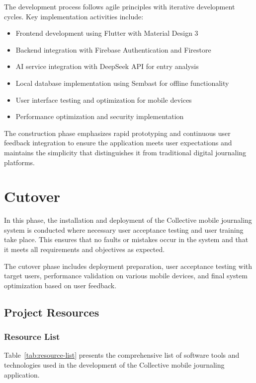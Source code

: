 The development process follows agile principles with iterative development cycles. Key implementation activities include:

\begin{itemize}
\item Frontend development using Flutter with Material Design 3
\item Backend integration with Firebase Authentication and Firestore
\item AI service integration with DeepSeek API for entry analysis
\item Local database implementation using Sembast for offline functionality
\item User interface testing and optimization for mobile devices
\item Performance optimization and security implementation
\end{itemize}

The construction phase emphasizes rapid prototyping and continuous user feedback integration to ensure the application meets user expectations and maintains the simplicity that distinguishes it from traditional digital journaling platforms.

\section{Cutover}\label{sec:cutover}

In this phase, the installation and deployment of the Collective mobile journaling system is conducted where necessary user acceptance testing and user training take place. This ensures that no faults or mistakes occur in the system and that it meets all requirements and objectives as expected.

The cutover phase includes deployment preparation, user acceptance testing with target users, performance validation on various mobile devices, and final system optimization based on user feedback.

\subsection{Project Resources}\label{subsec:projectResources}

\subsubsection{Resource List}

Table~\ref{tab:resource-list} presents the comprehensive list of software tools and technologies used in the development of the Collective mobile journaling application.

